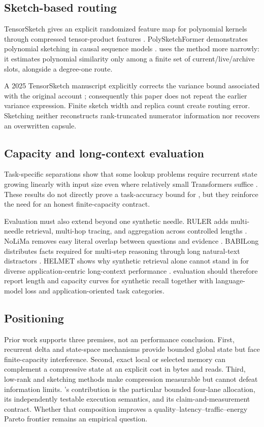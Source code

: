 \subsection{Sketch-based routing}

TensorSketch gives an explicit randomized feature map for polynomial kernels
through compressed tensor-product features
\citep{pham2013fast}. PolySketchFormer demonstrates polynomial sketching in
causal sequence models \citep{kacham2024polysketchformer}. \ALUCLU uses the
method more narrowly: it estimates polynomial similarity only among a finite
set of current/live/archive slots, alongside a degree-one route.

A 2025 TensorSketch manuscript explicitly corrects the variance bound
associated with the original account \citep{pham2025tensor}; consequently this
paper does not repeat the earlier variance expression. Finite sketch width and
replica count create routing error. Sketching neither reconstructs
rank-truncated numerator information nor recovers an overwritten capsule.

\subsection{Capacity and long-context evaluation}

Task-specific separations show that some lookup problems require recurrent
state growing linearly with input size even where relatively small
Transformers suffice \citep{bhattamishra2024separations}. These results do not
directly prove a task-accuracy bound for \ALUCLU, but they reinforce the need
for an honest finite-capacity contract.

Evaluation must also extend beyond one synthetic needle. RULER adds
multi-needle retrieval, multi-hop tracing, and aggregation across controlled
lengths \citep{hsieh2024ruler}. NoLiMa removes easy literal overlap between
questions and evidence \citep{modarressi2025nolima}. BABILong distributes
facts required for multi-step reasoning through long natural-text distractors
\citep{kuratov2024babilong}. HELMET shows why synthetic retrieval alone cannot
stand in for diverse application-centric long-context performance
\citep{yen2025helmet}. \ALUCLU evaluation should therefore report length and
capacity curves for synthetic recall together with language-model loss and
application-oriented task categories.

\subsection{Positioning}

Prior work supports three premises, not an \ALUCLU performance conclusion.
First, recurrent delta and state-space mechanisms provide bounded global state
but face finite-capacity interference. Second, exact local or selected memory
can complement a compressive state at an explicit cost in bytes and reads.
Third, low-rank and sketching methods make compression measurable but cannot
defeat information limits. \ALUCLU's contribution is the particular bounded
four-lane allocation, its independently testable execution semantics, and its
claim-and-measurement contract. Whether that composition improves a
quality--latency--traffic--energy Pareto frontier remains an empirical
question.
